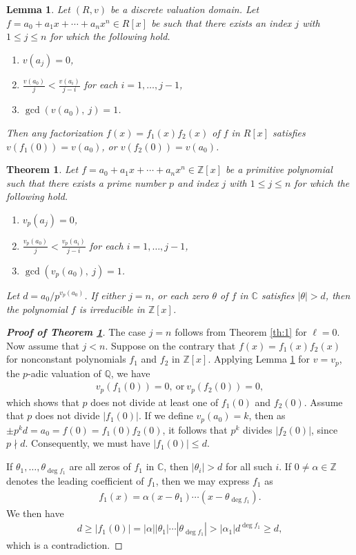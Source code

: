 \documentclass[10pt,a4paper]{amsart}
\newtheorem{theorem}{Theorem}
\newtheorem{lemma}{Lemma}
\begin{document}
\begin{lemma}\label{L:3}
Let $(R,v)$  be a discrete valuation domain. Let $f=a_0 + a_1x + \cdots + a_nx^n \in {R}[x]$ be such that there exists an index  $j$  with $1\leq j\leq n$ for which the following hold.
\begin{enumerate}[label=$(\roman*)$]
\item $v(a_j)=0$,
\item $\frac{v(a_0)}{j}<\frac{v(a_i)}{j-i}$ for each $i=1,\ldots, j-1$,
\item $\gcd(v(a_0),~j) = 1$.
\end{enumerate}
Then any factorization $f(x)=f_1(x)f_2(x)$ of $f$ in $R[x]$ satisfies $v(f_1(0))=v(a_0)$, or $v(f_2(0))=v(a_0)$.
\end{lemma}

\begin{theorem}\label{th:2}
Let $f=a_0 + a_1x + \cdots + a_nx^n \in \mathbb{Z}[x]$ be a primitive polynomial such that there exists a prime number $p$ and index $j$ with $1\leq j\leq n$ for which the following hold.
\begin{enumerate}[label=$(\roman*)$]
\item $v_p(a_j)=0$,
\item $\frac{v_p(a_0)}{j}<\frac{v_p(a_i)}{j-i}$ for each $i=1,\ldots,j-1$,
\item $\gcd(v_p(a_0),~j) = 1$.
\end{enumerate}
Let $d=a_0/p^{v_p(a_0)}$. If either $j=n$, or each zero $\theta$ of $f$ in ${\mathbb{C}}$ satisfies $|\theta|>d$, then  the polynomial $f$ is irreducible in $\mathbb{Z}[x]$.
\end{theorem}

\begin{proof}[\bf Proof of Theorem \ref{th:2}] The case $j=n$ follows from Theorem \ref{th:1} for $\ell=0$. Now assume that $j<n$. Suppose on the contrary that $f(x)=f_1(x)f_2(x)$ for nonconstant polynomials $f_1$ and $f_2$ in $\mathbb{Z}[x]$. Applying Lemma \ref{L:3} for $v=v_p$, the $p$-adic valuation of $\mathbb{Q}$, we have
 \begin{eqnarray}\label{e1}
v_p(f_1(0))=0,~\text{or}~v_p(f_2(0))=0,
 \end{eqnarray}
 which shows that $p$ does not divide at least one of $f_1(0)$ and $f_2(0)$. Assume that $p$ does not divide $|f_1(0)|$. If we define $v_p(a_0)=k$, then as $\pm p^kd=a_0=f(0)=f_1(0)f_2(0)$, it follows that $p^k$ divides $|f_2(0)|$, since $p\nmid d$. Consequently, we must have $|f_1(0)|\leq d$.

If $\theta_1,\ldots, \theta_{\deg f_1}$ are all zeros of $f_1$ in ${\mathbb{C}}$, then $|\theta_i|>d$ for all such $i$. If $0\neq \alpha \in \mathbb{Z}$ denotes the leading coefficient of $f_1$, then we may express $f_1$ as
 \begin{eqnarray*}
f_1(x)=\alpha(x-\theta_1)\cdots (x-\theta_{\deg f_1}).
\end{eqnarray*}
We then have
\begin{eqnarray*}
d\geq |f_1(0)|=|\alpha||\theta_1|\cdots |\theta_{\deg f_1}|>|\alpha_1| d^{\deg f_1}\geq d,
\end{eqnarray*}
which is a contradiction.
\end{proof}
\end{document}
